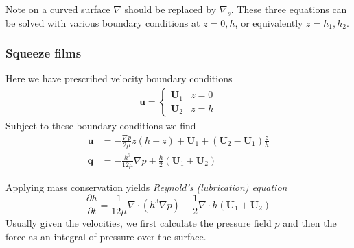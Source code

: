 \documentclass{jknotes}
\begin{document}
Note on a curved surface $\nabla$ should be replaced by $\nabla_s$. These three
equations can be solved with various boundary conditions at $z=0,h$, or
equivalently $z=h_1, h_2$.

\subsubsection{Squeeze films}
Here we have prescribed velocity boundary conditions
\begin{align}
	\symbf{u} = \begin{cases} \symbf{U}_1 & z=0 \\ \symbf{U}_2 & z=h
	\end{cases}
\end{align}
Subject to these boundary conditions we find
\begin{align}
	\symbf{u} &= -\frac{\nabla p}{2\mu} z(h-z) + \symbf{U}_1 +
	(\symbf{U}_2-\symbf{U}_1) \frac{z}{h}\\
	\symbf{q} &= -\frac{h^3}{12\mu}\nabla p +
	\frac{h}{2}(\symbf{U}_1+\symbf{U}_2)
\end{align}

Applying mass conservation yields \emph{Reynold's (lubrication) equation}
\begin{equation}
	\frac{\partial h}{\partial t} = \frac{1}{12\mu} \nabla \cdot (h^3 \nabla
	p) - \frac{1}{2} \nabla \cdot h(\symbf{U}_1+\symbf{U}_2)
\end{equation}
Usually given the velocities, we first calculate the pressure field $p$ and
then the force as an integral of pressure over the surface.
\end{document}
